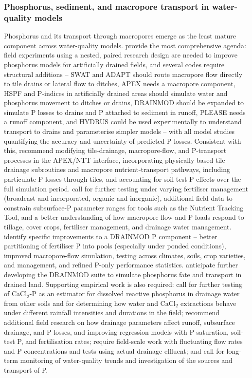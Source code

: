 \subsubsection{Phosphorus, sediment, and macropore transport in water-quality models}

Phosphorus and its transport through macropores emerge as the least mature
component across water-quality models. \textcite{Radcliffe2015} provide the most
comprehensive agenda: field experiments using a nested, paired research design
are needed to improve phosphorus models for artificially drained fields, and
several codes require structural additions -- SWAT and ADAPT should route
macropore flow directly to tile drains or lateral flow to ditches, APEX needs a
macropore component, HSPF and P-indices in artificially drained areas should
simulate water and phosphorus movement to ditches or drains, DRAINMOD should be
expanded to simulate P losses to drains and P attached to sediment in runoff,
PLEASE needs a runoff component, and HYDRUS could be used experimentally to
understand transport to drains and parameterise simpler models -- with all model
studies quantifying the accuracy and uncertainty of predicted P losses.
Consistent with this, \textcite{Guo2020b} recommend modifying tile-drainage,
macropore-flow, and P-transport processes in the APEX/NTT interface, incorporating
physically based tile-drainage subroutines and macropore nutrient-transport
pathways, including particulate-P losses through tiles, and accounting for soil-test-P
effects over the full simulation period. \textcite{Ford2017} call for further
testing under varying fertiliser management (broadcast and incorporated, organic
and inorganic), additional field data to constrain subsurface-P parameter ranges
for tools such as the Nutrient Tracking Tool, and a better understanding of how
macropore flow and P loads respond to tillage, cover crops, fertiliser management,
and drainage water management. \textcite{BinShokrana2023b} identify specific
improvements to a DRAINMOD P component -- better partitioning of fertiliser P into
pools (especially under ponded conditions), improved macropore-flow simulation,
testing across climates, soils, crop varieties, and management, and refined
P-only performance statistics. \textcite{Gowda2012} anticipate further developing
the DRAINMOD suite to simulate phosphorus fate and transport in drained land.
Supporting empirical work is also required: \textcite{McDowell2001b} call for
further testing of CaCl$_2$-P as an estimator for dissolved reactive phosphorus in
drainage water from other soils and for determining how water and CaCl$_2$
extractions behave under different rainfall intensities and durations in the
field; \textcite{Morrison2013} recommend additional field research on how drainage
parameters affect runoff, subsurface drainage, and P losses, and improving
regression models with P saturation, soil-test P, and fertilisation rates;
\textcite{Sanford2016} require field-scale work with fluctuating flow rates and P
concentrations and tests using actual drainage effluent; and \textcite{Jia2012}
call for long-term monitoring of water-quality trends and investigation of the
sources and transport of P.

